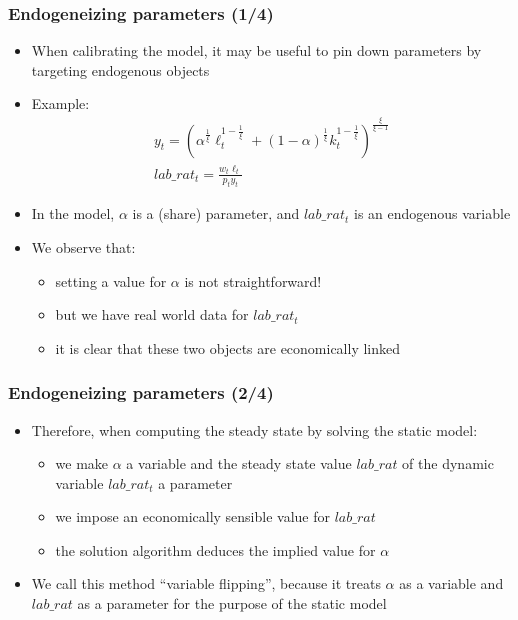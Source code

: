 \documentclass[aspectratio=169]{beamer}
\begin{document}
\begin{frame}
  \frametitle{Endogeneizing parameters (1/4)}
  \begin{itemize}
  \item When calibrating the model, it may be useful to pin down parameters by targeting endogenous objects
  \item Example:
    \begin{gather*}
      y_t = \left(\alpha^{\frac{1}{\xi}} \ell_t^{1-\frac{1}{\xi}} + (1-\alpha)^{\frac{1}{\xi}}k_t^{1-\frac{1}{\xi}}\right)^{\frac{\xi}{\xi - 1}} \\
      lab\_rat_t = \frac{w_t \ell_t}{p_t y_t}
    \end{gather*}
  \item In the model, $\alpha$ is a (share) parameter, and $lab\_rat_t$ is an endogenous variable
  \item We observe that:
    \begin{itemize}
    \item setting a value for $\alpha$ is not straightforward!
    \item but we have real world data for $lab\_rat_t$
    \item it is clear that these two objects are economically linked
    \end{itemize}
  \end{itemize}
\end{frame}

\begin{frame}[fragile=singleslide]
  \frametitle{Endogeneizing parameters (2/4)}
  \begin{itemize}
  \item Therefore, when computing the steady state by solving the static model:
    \begin{itemize}
    \item we make $\alpha$ a variable and the steady state value $lab\_rat$ of the dynamic variable $lab\_rat_t$ a parameter 
    \item we impose an economically sensible value for $lab\_rat$
    \item the solution algorithm deduces the implied value for $\alpha$
    \end{itemize}
  \item We call this method ``variable flipping'', because it treats $\alpha$ as a variable and $lab\_rat$ as a parameter for the purpose of the static model
  \end{itemize}
\end{frame}
\end{document}
